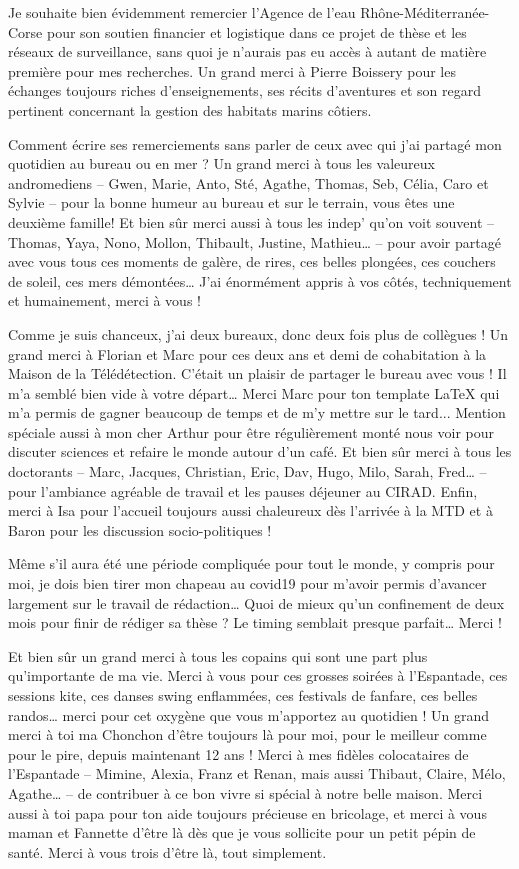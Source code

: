 Je souhaite bien évidemment remercier l’Agence de l’eau Rhône-Méditerranée-Corse pour son soutien financier et logistique dans ce projet de thèse et les réseaux de surveillance, sans quoi je n’aurais pas eu accès à autant de matière première pour mes recherches. Un grand merci à Pierre Boissery pour les échanges toujours riches d’enseignements, ses récits d'aventures et son regard pertinent concernant la gestion des habitats marins côtiers.

Comment écrire ses remerciements sans parler de ceux avec qui j’ai partagé mon quotidien au bureau ou en mer ? Un grand merci à tous les valeureux andromediens – Gwen, Marie, Anto, Sté, Agathe, Thomas, Seb, Célia, Caro et Sylvie – pour la bonne humeur au bureau et sur le terrain, vous êtes une deuxième famille! Et bien sûr merci aussi à tous les indep’ qu'on voit souvent – Thomas, Yaya, Nono, Mollon, Thibault, Justine, Mathieu… – pour avoir partagé avec vous tous ces moments de galère, de rires, ces belles plongées, ces couchers de soleil, ces mers démontées… J’ai énormément appris à vos côtés, techniquement et humainement, merci à vous !

Comme je suis chanceux, j’ai deux bureaux, donc deux fois plus de collègues ! Un grand merci à Florian et Marc pour ces deux ans et demi de cohabitation à la Maison de la Télédétection. C’était un plaisir de partager le bureau avec vous ! Il m’a semblé bien vide à votre départ… Merci Marc pour ton template LaTeX qui m'a permis de gagner beaucoup de temps et de m'y mettre sur le tard...  Mention spéciale aussi à mon cher Arthur pour être régulièrement monté nous voir pour discuter sciences et refaire le monde autour d’un café. Et bien sûr merci à tous les doctorants – Marc, Jacques, Christian, Eric, Dav, Hugo, Milo, Sarah, Fred… – pour l’ambiance agréable de travail et les pauses déjeuner au CIRAD. Enfin, merci à Isa pour l’accueil toujours aussi chaleureux dès l’arrivée à la MTD et à Baron pour les discussion socio-politiques !

Même s’il aura été une période compliquée pour tout le monde, y compris pour moi, je dois bien tirer mon chapeau au covid19 pour m’avoir permis d’avancer largement sur le travail de rédaction… Quoi de mieux qu’un confinement de deux mois pour finir de rédiger sa thèse ? Le timing semblait presque parfait… Merci !

Et bien sûr un grand merci à tous les copains qui sont une part plus qu’importante de ma vie. Merci à vous pour ces grosses soirées à l’Espantade, ces sessions kite, ces danses swing enflammées, ces festivals de fanfare, ces belles randos… merci pour cet oxygène que vous m’apportez au quotidien ! Un grand merci à toi ma Chonchon d’être toujours là pour moi, pour le meilleur comme pour le pire, depuis maintenant 12 ans ! Merci à mes fidèles colocataires de l’Espantade – Mimine, Alexia, Franz et Renan, mais aussi Thibaut, Claire, Mélo, Agathe… – de contribuer à ce bon vivre si spécial à notre belle maison. Merci aussi à toi papa pour ton aide toujours précieuse en bricolage, et merci à vous maman et Fannette d’être là dès que je vous sollicite pour un petit pépin de santé. Merci à vous trois d’être là, tout simplement. 

